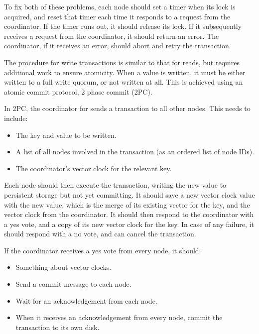 \documentclass[12pt,a4paper]{article}
\begin{document}
To fix both of these problems, each node should set a timer when its lock is acquired, and reset that timer each time it responds to a request from the coordinator. If the timer runs out, it should release its lock. If it subsequently receives a request from the coordinator, it should return an error. The coordinator, if it receives an error, should abort and retry the transaction.

The procedure for write transactions is similar to that for reads, but requires additional work to ensure atomicity. When a value is written, it must be either written to a full write quorum, or not written at all. This is achieved using an atomic commit protocol, 2 phase commit (2PC).

In 2PC, the coordinator for sends a transaction to all other nodes. This needs to include:

\begin{itemize}
  \item
  The key and value to be written.

  \item
  A list of all nodes involved in the transaction (as an ordered list of node IDs).

  \item
  The coordinator's vector clock for the relevant key.

\end{itemize}

Each node should then execute the transaction, writing the new value to persistent storage but not yet committing. It should save a new vector clock value with the new value, which is the merge of its existing vector for the key, and the vector clock from the coordinator. It should then respond to the coordinator with a yes vote, and a copy of its new vector clock for the key. In case of any failure, it should respond with a no vote, and can cancel the transaction.

If the coordinator receives a yes vote from every node, it should:

\begin{itemize}
  \item
  Something about vector clocks.

  \item
  Send a commit message to each node.

  \item
  Wait for an acknowledgement from each node.

  \item
  When it receives an acknowledgement from every node, commit the transaction to its own disk.

\end{itemize}
\end{document}

